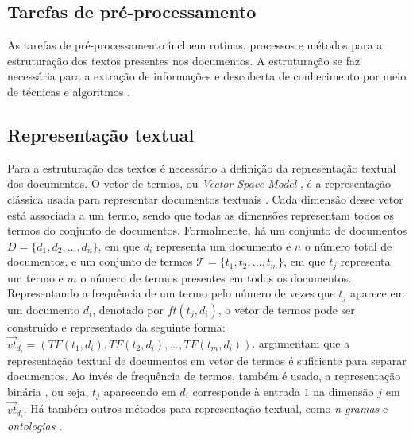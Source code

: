 \documentclass[
    12pt,                %
    oneside,            %
    a4paper,            %
    english,            %
    brazil                %
    ]{abntex2ppgsi}
\begin{document}
\begin{apendicesenv}
\section{Tarefas de pré-processamento}
\label{subsec:preprocessamento}

As tarefas de pré-processamento incluem rotinas, processos e métodos para a estruturação dos textos presentes nos documentos.
A estruturação se faz necessária para a extração de informações e descoberta de conhecimento por meio de técnicas e algoritmos \cite{Hotho2005}.

\subsection{Representação textual}

Para a estruturação dos textos é necessário a definição da representação textual dos documentos.
O vetor de termos, ou \textit{Vector Space Model} \cite{Salton1975}, é a representação clássica usada para representar documentos textuais \cite{Sebastiani2002,Lops2011}.
Cada dimensão desse vetor está associada a um termo, sendo que todas as dimensões representam todos os termos do conjunto de documentos.
Formalmente, há um conjunto de documentos $D = \{ d_1, d_2, \dots, d_n \}$, em que $d_i$ representa um documento e $n$ o número total de documentos, e um conjunto de termos $\mathcal{T} = \{ t_1, t_2, \dots, t_m \}$, em que $t_j$ representa um termo e $m$ o número de termos presentes em todos os documentos.
Representando a frequência de um termo pelo número de vezes que $t_j$ aparece em um documento $d_i$, denotado por $ft(t_j, d_i)$, o vetor de termos pode ser construído e representado da seguinte forma: $\vec{vt}_{d_i} = ( TF(t_1, d_i), TF(t_2, d_i), \dots, TF(t_m, d_i) )$.
 argumentam que a representação textual de documentos em vetor de termos é suficiente para separar documentos.
Ao invés de frequência de termos, também é usado, a representação binária \cite{Sebastiani2002}, ou seja, $t_j$ aparecendo em $d_i$ corresponde à entrada $1$ na dimensão $j$ em $\vec{vt}_{d_i}$.
Há também outros métodos para representação textual, como \textit{n-gramas} e \textit{ontologias} \cite{Lops2011}.


\end{apendicesenv}
\end{document}
